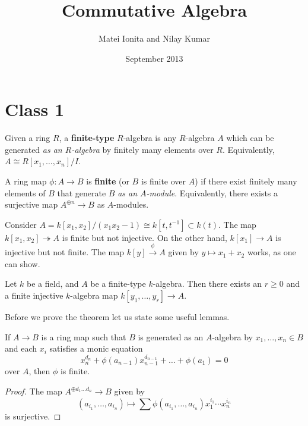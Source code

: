\documentclass{../mathnotes}
\title{Commutative Algebra}
\author{Matei Ionita and Nilay Kumar}
\date{September 2013}
\begin{document}
\maketitle

\section*{Class 1}

\begin{defn}
Given a ring $R$, a \textbf{finite-type} $R$-algebra is any $R$-algebra $A$ which can be generated \textit{as an $R$-algebra} by finitely many elements over $R$. Equivalently, $A\cong R[x_1,\ldots, x_n]/I$.
\end{defn}

\begin{defn}
A ring map $\phi:A\to B$ is \textbf{finite} (or $B$ is finite over $A$) if there exist finitely many elements of $B$ that generate $B$ \textit{as an $A$-module}. Equivalently, there exists a surjective map $A^{\oplus n}\to B$ as $A$-modules.
\end{defn}

\begin{exmp}
Consider $A=k[x_1,x_2]/(x_1x_2-1)\cong k[t,t^{-1}]\subset k(t)$. The map $k[x_1,x_2]\twoheadrightarrow A$ is finite but not injective. On the other hand, $k[x_1]\to A$ is injective but not finite. The map $k[y]\overset{\phi}{\to}A$ given by $y\mapsto x_1+x_2$ works, as one can show.
\end{exmp}


\begin{thm*}
Let $k$ be a field, and $A$ be a finite-type $k$-algebra. Then there exists an $r\geq0$ and a finite injective $k$-algebra map $k[y_1,\ldots,y_r]\to A$.
\end{thm*}

Before we prove the theorem let us state some useful lemmas.

\begin{lem}
\label{L1}
If $A\to B$ is a ring map such that $B$ is generated as an $A$-algebra by $x_1,\ldots,x_n\in B$ and each $x_i$ satisfies a monic equation
\[x_n^{d_n}+\phi(a_{n-1})x_{n-1}^{d_{n-1}}+\ldots+\phi(a_1)=0\]
over $A$, then $\phi$ is finite.
\end{lem}
\begin{proof}
The map $A^{\oplus d_1\ldots d_n}\to B$ given by
\[(a_{i_1},\ldots,a_{i_n})\mapsto\sum\phi(a_{i_1},\ldots,a_{i_n})x_1^{i_1}\cdots x_n^{i_n}\]
is surjective.
\end{proof}
\end{document}
